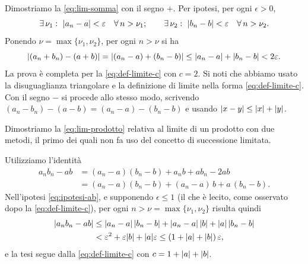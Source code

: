 \begin{dimostrazione}
Dimostriamo la \eqref{eq:lim-somma} con il segno $+$. Per ipotesi, per ogni $\epsilon>0$,
\begin{equation}\label{eq:ipotesi-ab}
  \exists\,\nu_{1}:\ \lvert a_{n}-a\rvert<\varepsilon\quad\forall\, n>\nu_{1}; \qquad
  \exists\,\nu_{2}:\ \lvert b_{n}-b\rvert<\varepsilon\quad\forall\, n>\nu_{2}.
\end{equation}
Ponendo $\nu=\max\{\nu_{1},\nu_{2}\}$, per ogni $n>\nu$ si ha
\begin{equation}\label{eq:somma-passo}
  \lvert (a_{n}+b_{n})-(a+b)\rvert=\lvert (a_{n}-a)+(b_{n}-b)\rvert\le\lvert a_{n}-a\rvert+\lvert b_{n}-b\rvert<2\varepsilon .
\end{equation}
La prova è completa per la \eqref{eq:def-limite-c} con $c=2$. Si noti che abbiamo usato la
disuguaglianza triangolare e la definizione di limite nella forma \eqref{eq:def-limite-c}.
Con il segno $-$ si procede allo stesso modo, scrivendo
$(a_{n}-b_{n})-(a-b)=(a_{n}-a)-(b_{n}-b)$ e usando $\lvert x-y\rvert\le\lvert x\rvert+\lvert y\rvert$.
\end{dimostrazione}

Dimostriamo la \eqref{eq:lim-prodotto} relativa al limite di un prodotto con due metodi,
il primo dei quali non fa uso del concetto di successione limitata.

\begin{dimostrazione}
Utilizziamo l'identità
\begin{equation}\label{eq:identita-prodotto}
\begin{split}
  a_{n}b_{n}-ab&=(a_{n}-a)(b_{n}-b)+a_{n}b+ab_{n}-2ab\\
  &=(a_{n}-a)(b_{n}-b)+(a_{n}-a)\,b+a\,(b_{n}-b).
\end{split}
\end{equation}
Nell'ipotesi \eqref{eq:ipotesi-ab}, e supponendo $\epsilon\le1$ (il che è lecito, come
osservato dopo la \eqref{eq:def-limite-c}), per ogni $n>\nu=\max\{\nu_{1},\nu_{2}\}$
risulta quindi
\begin{equation}\label{eq:prodotto-passo-1}
\begin{split}
  \lvert a_{n}b_{n}-ab\rvert&\le\lvert a_{n}-a\rvert\,\lvert b_{n}-b\rvert+\lvert a_{n}-a\rvert\,\lvert b\rvert+\lvert a\rvert\,\lvert b_{n}-b\rvert\\
  &<\varepsilon^{2}+\varepsilon\lvert b\rvert+\lvert a\rvert\varepsilon\le(1+\lvert a\rvert+\lvert b\rvert)\,\varepsilon,
\end{split}
\end{equation}
e la tesi segue dalla \eqref{eq:def-limite-c} con $c=1+\lvert a\rvert+\lvert b\rvert$.
\end{dimostrazione}

